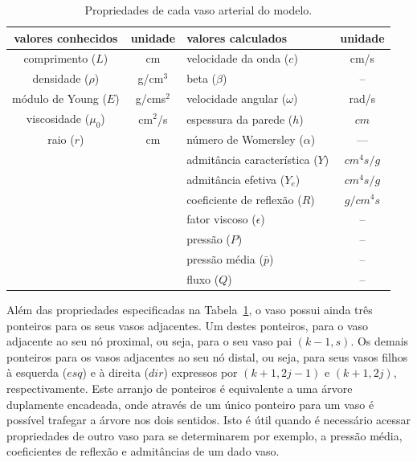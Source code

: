 \begin{table}[h]
	\begin{tabularx}{\textwidth}{c|c|X|c}
		\toprule
		\textbf{valores conhecidos} & \textbf{unidade} & \textbf{valores calculados} & \textbf{unidade} \\\midrule
		
		comprimento ($L$) & cm &  velocidade da onda ($c$) & cm/s \\
		
		densidade ($\rho$) & g/cm$^3$ &   beta ($\beta$) & -- \\
		
		módulo de Young ($E$) & g/cms$^2$  & velocidade angular ($\omega$) & rad/s \\
		
		viscosidade ($\mu_0$) & cm$^2$/s &	espessura da parede ($h$) &  $cm$ \\
		
		raio ($r$) & cm  & número de Womersley ($\alpha$) & --- \\
		
		& & admitância característica ($Y$) & $cm^4 s/g $\\
		
		&  & admitância efetiva ($Y_e$) & $cm^4 s/g $\\
		
		&  & coeficiente de reflexão ($R$) & $g /cm^4 s$ \\
		
		& & fator viscoso ($\epsilon$) & -- \\
		
		& & pressão ($P$) & -- \\
		
		&  &	pressão média ($\bar{p}$) & -- \\
		
		& &	fluxo ($Q$) & -- \\
		\hline
	\end{tabularx}
	\caption{Propriedades de cada vaso arterial do modelo.}
	\label{tab:info_vaso}
\end{table}

Além das propriedades especificadas na Tabela~\ref{tab:info_vaso}, o vaso possui ainda três ponteiros para os seus vasos adjacentes. Um destes ponteiros, para o vaso adjacente ao seu nó proximal, ou seja, para o seu vaso pai $(k-1,s)$. Os demais ponteiros para os vasos adjacentes ao seu nó distal, ou seja, para seus vasos filhos à esquerda ($esq$) e à direita ($dir$) expressos por $(k+1,2j-1)$ e $(k+1,2j)$, respectivamente. Este arranjo de ponteiros é equivalente a uma árvore duplamente encadeada, onde através de um único ponteiro para um vaso é possível trafegar a árvore nos dois sentidos. Isto é útil quando é necessário acessar propriedades de outro vaso para se determinarem por exemplo, a pressão média, coeficientes de reflexão e admitâncias de um dado vaso.

